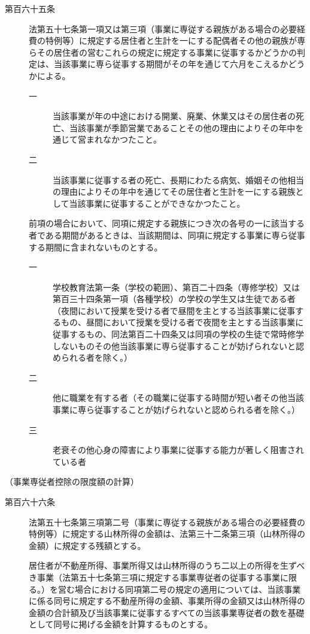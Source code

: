 \documentclass[twocolumn,a4j,10pt]{ltjtarticle}
\begin{document}
\begin{description}
\item[第百六十五条]法第五十七条第一項又は第三項（事業に専従する親族がある場合の必要経費の特例等）に規定する居住者と生計を一にする配偶者その他の親族が専らその居住者の営むこれらの規定に規定する事業に従事するかどうかの判定は、当該事業に専ら従事する期間がその年を通じて六月をこえるかどうかによる。
\begin{description}
\item[一]当該事業が年の中途における開業、廃業、休業又はその居住者の死亡、当該事業が季節営業であることその他の理由によりその年中を通じて営まれなかつたこと。
\item[二]当該事業に従事する者の死亡、長期にわたる病気、婚姻その他相当の理由によりその年中を通じてその居住者と生計を一にする親族として当該事業に従事することができなかつたこと。
\end{description}
\item[]前項の場合において、同項に規定する親族につき次の各号の一に該当する者である期間があるときは、当該期間は、同項に規定する事業に専ら従事する期間に含まれないものとする。
\begin{description}
\item[一]学校教育法第一条（学校の範囲）、第百二十四条（専修学校）又は第百三十四条第一項（各種学校）の学校の学生又は生徒である者（夜間において授業を受ける者で昼間を主とする当該事業に従事するもの、昼間において授業を受ける者で夜間を主とする当該事業に従事するもの、同法第百二十四条又は同項の学校の生徒で常時修学しないものその他当該事業に専ら従事することが妨げられないと認められる者を除く。）
\item[二]他に職業を有する者（その職業に従事する時間が短い者その他当該事業に専ら従事することが妨げられないと認められる者を除く。）
\item[三]老衰その他心身の障害により事業に従事する能力が著しく阻害されている者
\end{description}
\end{description}
\noindent\hspace{10pt}（事業専従者控除の限度額の計算）
\begin{description}
\item[第百六十六条]法第五十七条第三項第二号（事業に専従する親族がある場合の必要経費の特例等）に規定する山林所得の金額は、法第三十二条第三項（山林所得の金額）に規定する残額とする。
\item[]居住者が不動産所得、事業所得又は山林所得のうち二以上の所得を生ずべき事業（法第五十七条第三項に規定する事業専従者の従事する事業に限る。）を営む場合における同項第二号の規定の適用については、当該事業に係る同号に規定する不動産所得の金額、事業所得の金額又は山林所得の金額の合計額及び当該事業に従事するすべての当該事業専従者の数を基礎として同号に掲げる金額を計算するものとする。
\end{description}
\end{document}
